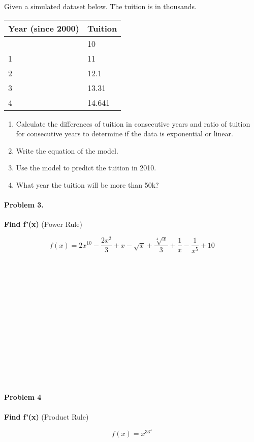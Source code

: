 \documentclass[
  letterpaper,
  DIV=11,
  numbers=noendperiod]{scrartcl}
\let\oldparagraph\paragraph
\renewcommand{\paragraph}[1]{\oldparagraph{#1}\mbox{}}
\begin{document}
Given a simulated dataset below. The tuition is in thousands.

\begin{longtable}[]{@{}ll@{}}
\toprule\noalign{}
Year (since 2000) & Tuition \\
\midrule\noalign{}
\endhead
\bottomrule\noalign{}
\endlastfoot
0 & 10 \\
1 & 11 \\
2 & 12.1 \\
3 & 13.31 \\
4 & 14.641 \\
\end{longtable}

\begin{enumerate}
\def\labelenumi{\arabic{enumi}.}
\item
  Calculate the differences of tuition in consecutive years and ratio of
  tuition for consecutive years to determine if the data is exponential
  or linear.
\item
  Write the equation of the model.
\item
  Use the model to predict the tuition in 2010.
\item
  What year the tuition will be more than 50k?
\end{enumerate}

\pagebreak

\paragraph{Problem 3.}\label{problem-3.}

\textbf{Find f'(x)} (Power Rule)

\[f(x) = 2x^{10} - \frac{2x^2}{3} + x - \sqrt{x} + \frac{\sqrt[4]{x}}{3} + \frac{1}{x} - \frac{1}{x^5} + 10\]\\
\strut \\
\strut \\
\strut \\
\strut \\
\strut \\
\strut \\
\strut \\

\paragraph{Problem 4}\label{problem-4}

\textbf{Find f'(x)} (Product Rule)

\[f(x) = x^33^x\]\\
\strut \\
\strut \\
\strut \\
\strut \\
\strut \\
\strut \\
\strut \\
\end{document}
